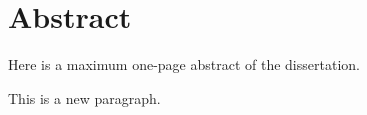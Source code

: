 

\chapter*{Abstract}

Here is a maximum one-page abstract of the
dissertation.

This is a new paragraph.
